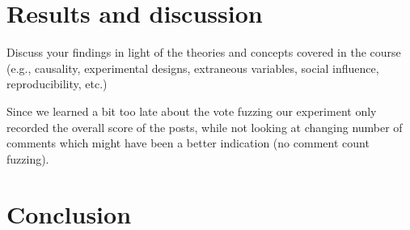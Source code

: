 \documentclass[fleqn,12pt]{article}
\begin{document}
\section{Results and discussion}

Discuss your findings in light of the theories and concepts covered in the course (e.g., causality, experimental designs,
extraneous variables, social influence, reproducibility, etc.)

Since we learned a bit too late about the vote fuzzing our experiment only recorded the overall score of the posts, while not looking at changing number of comments
which might have been a better indication (no comment count fuzzing).
\section{Conclusion}


 \newpage 


\end{document}
